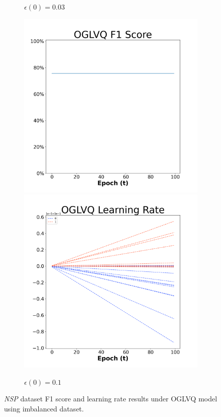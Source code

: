 \begin{figure}[H]
\begin{subfigure}{0.3\textwidth}
\caption{$\epsilon(0)=0.03$}
\end{subfigure}\hfil %
\begin{subfigure}{0.3\textwidth}
\includegraphics[width=\linewidth]{images/exper2/NSP/OGLVQ_0.1_f1.png}
\includegraphics[width=\linewidth]{images/exper2/NSP/OGLVQ_0.1_lr.png}
\caption{$\epsilon(0)=0.1$}
\end{subfigure}

\caption{\textit{NSP} dataset F1 score and learning rate results under OGLVQ model using imbalanced dataset.}
\end{figure}
